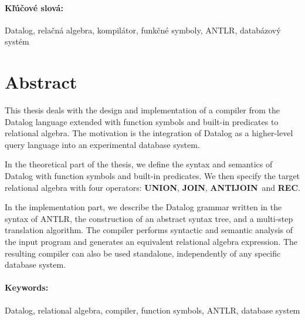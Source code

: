 \documentclass[12pt, twoside]{book}
\newcommand{\UNION}{\textbf{UNION}} \newcommand{\JOIN}{\textbf{JOIN}}
\newcommand{\ANTIJOIN}{\textbf{ANTIJOIN}} \newcommand{\REC}{\textbf{REC}}
\theoremstyle{defstyle}
\begin{document}
\paragraph*{Kľúčové slová:} Datalog, relačná algebra, kompilátor, funkčné symboly, ANTLR, databázový
systém


\newpage 
\section*{Abstract}

This thesis deals with the design and implementation of a compiler from the Datalog language
extended with function symbols and built-in predicates to relational algebra. The motivation is the
integration of Datalog as a higher-level query language into an experimental database system.

In the theoretical part of the thesis, we define the syntax and semantics of Datalog with function
symbols and built-in predicates. We then specify the target relational algebra with four operators:
\UNION, \JOIN, \ANTIJOIN\ and \REC.

In the implementation part, we describe the Datalog grammar written in the syntax of ANTLR, the construction of
an abstract syntax tree, and a multi-step translation algorithm. The compiler performs syntactic and
semantic analysis of the input program and generates an equivalent relational algebra expression.
The resulting compiler can also be used standalone, independently of any specific database system.

\paragraph*{Keywords:} Datalog, relational algebra, compiler, function symbols, ANTLR, database
system


%
%
%
\end{document}
